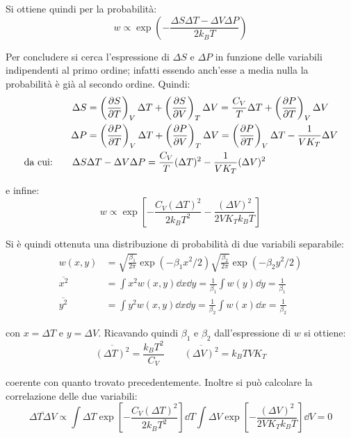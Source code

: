 \noindent Si ottiene quindi per la probabilità:
\begin{equation*}
	w \propto \exp \left(- \frac{\Delta S \Delta T - \Delta V \Delta P}{2 k_B T}\right)
\end{equation*}

Per concludere si cerca l'espressione di $\Delta S$ e $\Delta P$ in funzione delle variabili indipendenti al primo ordine; infatti essendo anch'esse a media nulla la probabilità è già al secondo ordine. Quindi:
\begin{align*}
\Delta S &= \left(\frac{\partial {S}}{\partial {T}}\right)_{V} \Delta T + \left(\frac{\partial {S}}{\partial {V}}\right)_{T} \Delta V = \frac{C_V}{T} \Delta T  + \left(\frac{\partial {P}}{\partial {T}}\right)_{V} \Delta V \\
\Delta P &= \left(\frac{\partial {P}}{\partial {T}}\right)_{V} \Delta T + \left(\frac{\partial {P}}{\partial {V}}\right)_{T} \Delta V =   \left(\frac{\partial {P}}{\partial {T}}\right)_{V}\Delta T - \frac{1}{V K_T}  \Delta V\\
\text{da cui:} \qquad  \Delta S &\Delta T - \Delta V \Delta P = \frac{C_V}{T} (\Delta T)^2 - \frac{1}{V K_T}  (\Delta V)^2
\end{align*}

\noindent e infine:
\begin{equation*}
w \propto \exp \left[- \frac{C_V (\Delta T)^2}{2 k_B T^2} - \frac{(\Delta V)^2}{2 V K_T k_B T}  \right]
\end{equation*}

Si è quindi ottenuta una distribuzione di probabilità di due variabili separabile:
\begin{align*}
w(x,y) &= \sqrt{\frac{\beta_1}{2\pi}}  \exp (-\beta_1 x^2 /2) \sqrt{\frac{\beta_2}{2\pi}}  \exp (-\beta_2 y^2 /2)\\
\overline{x^2} &= \int x^2 w(x,y) \dd x \dd y = \frac{1}{\beta_1} \int w(y) \dd y = \frac{1}{\beta_1}\\
\overline{y^2} &= \int y^2 w(x,y) \dd x \dd y = \frac{1}{\beta_2} \int w(x) \dd x = \frac{1}{\beta_2}
\end{align*}

\noindent con $x = \Delta T$ e $y = \Delta V$. Ricavando quindi $\beta_1$ e $\beta_2$ dall'espressione di $w$ si ottiene:
\begin{equation*}
\overline{(\Delta T)^2} = \frac{k_B T^2}{C_V} \qquad \overline{(\Delta V)^2} = k_B T V K_T
\end{equation*}

\noindent coerente con quanto trovato precedentemente. Inoltre si può calcolare la correlazione delle due variabili:
\begin{equation*}
\overline{\Delta T \Delta V} \propto \int \Delta T \exp [- \frac{C_V (\Delta T)^2}{2 k_B T^2}] \dd T \int \Delta V \exp [- \frac{(\Delta V)^2}{2 V K_T k_B T}] \dd V = 0
\end{equation*}

